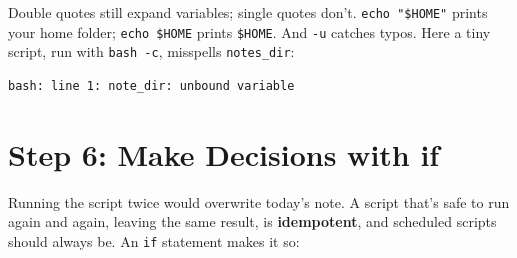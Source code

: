 Double quotes still expand variables; single quotes don't. \texttt{echo\ "\$HOME"} prints your home folder; \texttt{echo\ \textquotesingle{}\$HOME\textquotesingle{}} prints \texttt{\$HOME}. And \texttt{-u} catches typos. Here a tiny script, run with \texttt{bash\ -c}, misspells \texttt{notes\_dir}:

\begin{codeblock}

\begin{Shaded}
\begin{Highlighting}[]
  
\end{Highlighting}
\end{Shaded}

\end{codeblock}

\begin{codeblock}
\begin{Verbatim}[formatcom=\outputstyle]
bash: line 1: note_dir: unbound variable
\end{Verbatim}
\end{codeblock}

\section{Step 6: Make Decisions with if}\label{09-lab-automate-a-daily-chore:step-6-make-decisions-with-if}

Running the script twice would overwrite today's note. A script that's safe to run again and again, leaving the same result, is \textbf{idempotent}, and scheduled scripts should always be. An \texttt{if} statement makes it so:

\begin{codeblock}

\begin{Shaded}
\begin{Highlighting}[]
 \KeywordTok{[[}   \KeywordTok{]];} 
   
    \OperatorTok{\textgreater{}} 
   
\end{Highlighting}
\end{Shaded}

\end{codeblock}

